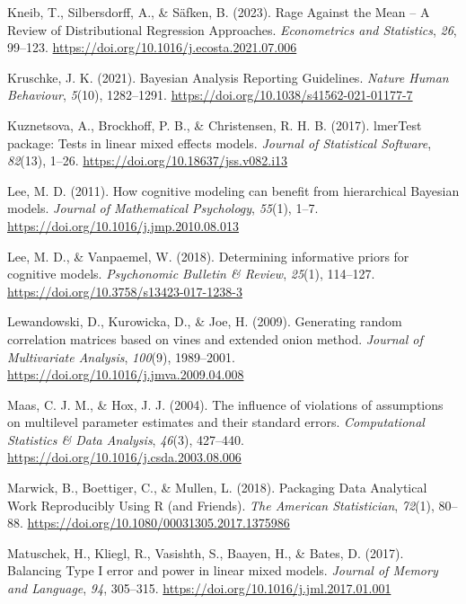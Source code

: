 \documentclass[
  doc,12pt,floatsintext]{apa7}
\newlength{\cslhangindent}
\newenvironment{CSLReferences}[2] %
 {\begin{list}{}{%
  \setlength{\itemindent}{0pt}
  \setlength{\leftmargin}{0pt}
  \setlength{\parsep}{0pt}
  \ifodd #1
   \setlength{\leftmargin}{\cslhangindent}
   \setlength{\itemindent}{-1\cslhangindent}
  \fi
  \setlength{\itemsep}{#2\baselineskip}}}
 {\end{list}}
\begin{document}
\begin{CSLReferences}{1}{0}
Kneib, T., Silbersdorff, A., \& Säfken, B. (2023). Rage {Against} the {Mean} -- {A Review} of {Distributional Regression Approaches}. \emph{Econometrics and Statistics}, \emph{26}, 99--123. \url{https://doi.org/10.1016/j.ecosta.2021.07.006}

Kruschke, J. K. (2021). Bayesian {Analysis Reporting Guidelines}. \emph{Nature Human Behaviour}, \emph{5}(10), 1282--1291. \url{https://doi.org/10.1038/s41562-021-01177-7}

Kuznetsova, A., Brockhoff, P. B., \& Christensen, R. H. B. (2017). {lmerTest} package: Tests in linear mixed effects models. \emph{Journal of Statistical Software}, \emph{82}(13), 1--26. \url{https://doi.org/10.18637/jss.v082.i13}

Lee, M. D. (2011). How cognitive modeling can benefit from hierarchical {Bayesian} models. \emph{Journal of Mathematical Psychology}, \emph{55}(1), 1--7. \url{https://doi.org/10.1016/j.jmp.2010.08.013}

Lee, M. D., \& Vanpaemel, W. (2018). Determining informative priors for cognitive models. \emph{Psychonomic Bulletin \& Review}, \emph{25}(1), 114--127. \url{https://doi.org/10.3758/s13423-017-1238-3}

Lewandowski, D., Kurowicka, D., \& Joe, H. (2009). Generating random correlation matrices based on vines and extended onion method. \emph{Journal of Multivariate Analysis}, \emph{100}(9), 1989--2001. \url{https://doi.org/10.1016/j.jmva.2009.04.008}

Maas, C. J. M., \& Hox, J. J. (2004). The influence of violations of assumptions on multilevel parameter estimates and their standard errors. \emph{Computational Statistics \& Data Analysis}, \emph{46}(3), 427--440. \url{https://doi.org/10.1016/j.csda.2003.08.006}

Marwick, B., Boettiger, C., \& Mullen, L. (2018). Packaging {Data Analytical Work Reproducibly Using R} (and {Friends}). \emph{The American Statistician}, \emph{72}(1), 80--88. \url{https://doi.org/10.1080/00031305.2017.1375986}

Matuschek, H., Kliegl, R., Vasishth, S., Baayen, H., \& Bates, D. (2017). Balancing {Type I} error and power in linear mixed models. \emph{Journal of Memory and Language}, \emph{94}, 305--315. \url{https://doi.org/10.1016/j.jml.2017.01.001}


\end{CSLReferences}
\end{document}
